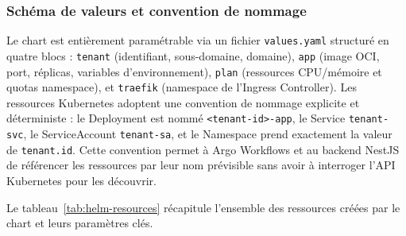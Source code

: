 \subsubsection*{Schéma de valeurs et convention de nommage}

Le chart est entièrement paramétrable via un fichier \texttt{values.yaml} structuré en quatre blocs : \texttt{tenant} (identifiant, sous-domaine, domaine), \texttt{app} (image OCI, port, réplicas, variables d'environnement), \texttt{plan} (ressources CPU/mémoire et quotas namespace), et \texttt{traefik} (namespace de l'Ingress Controller). Les ressources Kubernetes adoptent une convention de nommage explicite et déterministe : le Deployment est nommé \texttt{<tenant-id>-app}, le Service \texttt{tenant-svc}, le ServiceAccount \texttt{tenant-sa}, et le Namespace prend exactement la valeur de \texttt{tenant.id}. Cette convention permet à Argo Workflows et au backend NestJS de référencer les ressources par leur nom prévisible sans avoir à interroger l'API Kubernetes pour les découvrir.

Le tableau~\ref{tab:helm-resources} récapitule l'ensemble des ressources créées par le chart et leurs paramètres clés.

